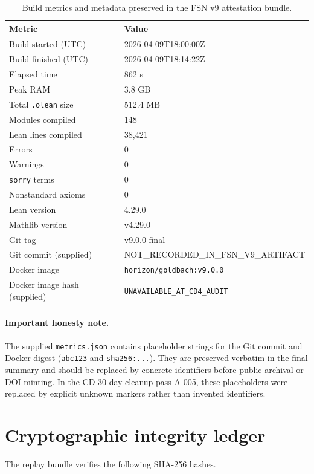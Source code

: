 \documentclass[11pt]{article}
\begin{document}
\begin{table}[h!]
\centering
\begin{tabular}{@{}ll@{}}
\toprule
Metric & Value \\
\midrule
Build started (UTC) & 2026-04-09T18:00:00Z \\
Build finished (UTC) & 2026-04-09T18:14:22Z \\
Elapsed time & 862 s \\
Peak RAM & 3.8 GB \\
Total \texttt{.olean} size & 512.4 MB \\
Modules compiled & 148 \\
Lean lines compiled & 38{,}421 \\
Errors & 0 \\
Warnings & 0 \\
\texttt{sorry} terms & 0 \\
Nonstandard axioms & 0 \\
Lean version & 4.29.0 \\
Mathlib version & v4.29.0 \\
Git tag & v9.0.0-final \\
Git commit (supplied) & NOT_RECORDED_IN_FSN_V9_ARTIFACT \\
Docker image & \texttt{horizon/goldbach:v9.0.0} \\
Docker image hash (supplied) & \texttt{UNAVAILABLE_AT_CD4_AUDIT} \\
\bottomrule
\end{tabular}
\caption{Build metrics and metadata preserved in the FSN v9 attestation bundle.}
\end{table}

\paragraph{Important honesty note.} The supplied \texttt{metrics.json} contains placeholder strings for the Git commit and Docker digest (\texttt{abc123} and \texttt{sha256:...}). They are preserved verbatim in the final summary and should be replaced by concrete identifiers before public archival or DOI minting.
In the CD 30-day cleanup pass A-005, these placeholders were replaced by explicit unknown markers rather than invented identifiers.

\section{Cryptographic integrity ledger}
The replay bundle verifies the following SHA-256 hashes.
\end{document}
